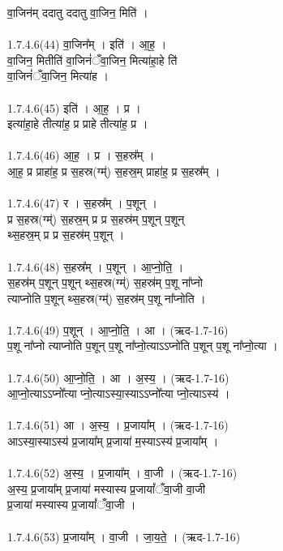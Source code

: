 वा॒जिन॑म् ददातु ददातु वा॒जिन॒ मिति॑ ।\\
\\
1.7.4.6(44)  वा॒जिन᳚म् । इति॑ । आ॒ह॒ ।\\
वा॒जिन॒ मितीति॑ वा॒जिनं॑ँवा॒जिन॒ मित्या॑हा॒हे ति॑ \\
वा॒जिनं॑ँवा॒जिन॒ मित्या॑ह ।\\
\\
1.7.4.6(45)  इति॑ । आ॒ह॒ । प्र ।\\
इत्या॑हा॒हे तीत्या॑ह॒ प्र प्राहे तीत्या॑ह॒ प्र ।\\
\\
1.7.4.6(46)  आ॒ह॒ । प्र । स॒हस्र᳚म् ।\\
आ॒ह॒ प्र प्राहा॑ह॒ प्र स॒हस्र(ग्म्॑) स॒हस्र॒म् प्राहा॑ह॒ प्र स॒हस्र᳚म् ।\\
\\
1.7.4.6(47)  र । स॒हस्र᳚म् । प॒शून् ।\\
प्र स॒हस्र(ग्म्॑) स॒हस्र॒म् प्र प्र स॒हस्र॑म् प॒शून् प॒शून्\\
थ्स॒हस्र॒म् प्र प्र स॒हस्र॑म् प॒शून् ।\\
\\
1.7.4.6(48)  स॒हस्र᳚म् । प॒शून् । आ॒प्नो॒ति॒ ।\\
स॒हस्र॑म् प॒शून् प॒शून् थ्स॒हस्र(ग्म्॑) स॒हस्र॑म् प॒शू ना᳚प्नो\\
त्याप्नोति प॒शून् थ्स॒हस्र(ग्म्॑) स॒हस्र॑म् प॒शू ना᳚प्नोति ।\\
\\
1.7.4.6(49)  प॒शून् । आ॒प्नो॒ति॒ । आ । (ऋद-1.7-16)\\
प॒शू ना᳚प्नो त्याप्नोति प॒शून् प॒शू ना᳚प्नो॒त्याऽऽप्नो॑ति प॒शून् प॒शू ना᳚प्नो॒त्या ।\\
\\
1.7.4.6(50)  आ॒प्नो॒ति॒ । आ । अ॒स्य॒ । (ऋद-1.7-16)\\
आ॒प्नो॒त्याऽऽप्नो᳚त्या प्नो॒त्याऽस्या॒स्याऽऽप्नो᳚त्या प्नो॒त्याऽस्य॑ ।\\
\\
1.7.4.6(51)  आ । अ॒स्य॒ । प्र॒जाया᳚म् । (ऋद-1.7-16)\\
आऽस्या॒स्याऽस्य॑ प्र॒जाया᳚म् प्र॒जाया॑ म॒स्याऽस्य॑ प्र॒जाया᳚म् ।\\
\\
1.7.4.6(52)  अ॒स्य॒ । प्र॒जाया᳚म् । वा॒जी । (ऋद-1.7-16)\\
अ॒स्य॒ प्र॒जाया᳚म् प्र॒जाया॑ मस्यास्य प्र॒जायां᳚ँवा॒जी वा॒जी \\
प्र॒जाया॑ मस्यास्य प्र॒जायां᳚ँवा॒जी ।\\
\\
1.7.4.6(53)  प्र॒जाया᳚म् । वा॒जी । जा॒य॒ते॒ । (ऋद-1.7-16)\\
